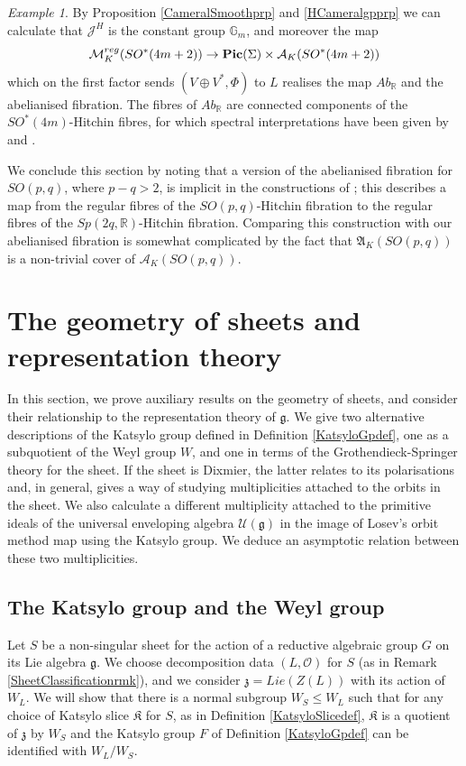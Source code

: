 \documentclass{amsart}
\theoremstyle{remark}
\newtheorem{example}[theorem]{Example}
\numberwithin{theorem}{section}
\numberwithin{equation}{section}
\begin{document}
\begin{example}
By Proposition \ref{CameralSmoothprp} and \ref{HCameralgpprp} we can calculate that $\mathcal J^H$ is the constant group $\mathbb{G}_m$, and moreover the map
\begin{equation}
    \mathcal M_K^{reg}(SO^*(4m+2)) \rightarrow {\bf Pic}(\Sigma) \times \mathcal A_K( SO^*(4m+2))
\end{equation}
which on the first factor sends $(V \oplus V^*, \Phi)$ to $L$ realises the map $ Ab_{\mathbb{R}}$ and the abelianised fibration. The fibres of $Ab_\mathbb{R}$ are connected components of the $SO^*(4m)$-Hitchin fibres, for which spectral interpretations have been given by \cite{HS} and \cite{Branco}.
\end{example}

We conclude this section by noting that a version of the abelianised fibration for $SO(p,q)$, where $p-q>2$, is implicit in the constructions of \cite[Section 3]{BS}; this describes a map from the regular fibres of the $SO(p,q)$-Hitchin fibration to the regular fibres of the $Sp(2q,\mathbb{R})$-Hitchin fibration. Comparing this construction with our abelianised fibration is somewhat complicated by the fact that $\mathfrak{A}_K(SO(p,q))$ is a non-trivial cover of $\mathcal A_K(SO(p,q))$.

\section{The geometry of sheets and representation theory}\label{AdjointQuotientKatsyloscn}
In this section, we prove auxiliary results on the geometry of sheets, and consider their relationship to the representation theory of $\mathfrak{g}$. We give two alternative descriptions of the Katsylo group defined in Definition \ref{KatsyloGpdef}, one as a subquotient of the Weyl group $W$, and one in terms of the Grothendieck-Springer theory for the sheet. If the sheet is Dixmier, the latter relates to its polarisations and, in general, gives a way of studying multiplicities attached to the orbits in the sheet. We also calculate a different multiplicity attached to the primitive ideals of the universal enveloping algebra $\mathcal U(\mathfrak{g})$ in the image of Losev's orbit method map using the Katsylo group. We deduce an asymptotic relation between these two multiplicities.

\subsection{The Katsylo group and the Weyl group}\label{KatsyloWeylsbn}
Let $S$ be a non-singular sheet for the action of a reductive algebraic group $G$ on its Lie algebra $\mathfrak{g}$. We choose decomposition data $(L, \mathcal O)$ for $S$ (as in Remark \ref{SheetClassificationrmk}), and we consider $\mathfrak{z} =Lie(Z(L))$ with its action of $W_L$. We will show that there is a normal subgroup $W_S \leq W_L$ such that for any choice of Katsylo slice $\mathfrak{K}$ for $S$, as in Definition \ref{KatsyloSlicedef}, $\mathfrak{K}$ is a quotient of $\mathfrak{z}$ by $W_S$ and the Katsylo group $F$ of Definition \ref{KatsyloGpdef} can be identified with $W_L/W_S$.
\end{document}

